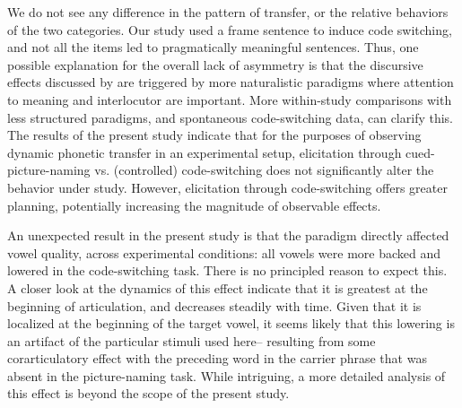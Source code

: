 \documentclass[12 pt]{article}
\begin{document}
We do not see any difference in the pattern of transfer, or the relative behaviors of the two categories. Our study used a frame sentence to induce code switching, and not all the items led to pragmatically meaningful sentences. Thus, one possible explanation for the overall lack of asymmetry is that the discursive effects discussed by \cite{olson2013bilingual} are triggered by more naturalistic paradigms where attention to meaning and interlocutor are important. More within-study comparisons with less structured paradigms, and spontaneous code-switching data, can clarify this. The results of the present study indicate that for the purposes of observing dynamic phonetic transfer in an experimental setup, elicitation through cued-picture-naming vs. (controlled) code-switching does not significantly alter the behavior under study. However, elicitation through code-switching offers greater planning, potentially increasing the magnitude of observable effects. 


An unexpected result in the present study is that the paradigm directly affected vowel quality, across experimental conditions: all vowels were more backed and lowered in the code-switching task. There is no principled reason to expect this. A closer look at the dynamics of this effect indicate that it is greatest at the beginning of articulation, and decreases steadily with time. Given that it is localized at the beginning of the target vowel, it seems likely that this lowering is an artifact of the particular stimuli used here-- resulting from some corarticulatory effect with the preceding word in the carrier phrase that was absent in the picture-naming task. While intriguing, a more detailed analysis of this effect is beyond the scope of the present study.  
\end{document}
